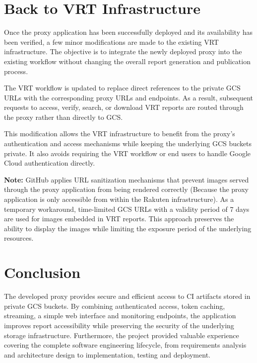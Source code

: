 \section{Back to VRT Infrastructure}

Once the proxy application has been successfully deployed and its availability has been verified, a few minor modifications are made to the existing \ac{VRT} infrastructure. The objective is to integrate the newly deployed proxy into the existing workflow without changing the overall report generation and publication process.

The \ac{VRT} workflow is updated to replace direct references to the private \ac{GCS} URLs with the corresponding proxy URLs and endpoints. As a result, subsequent requests to access, verify, search, or download \ac{VRT} reports are routed through the proxy rather than directly to \ac{GCS}.

This modification allows the \ac{VRT} infrastructure to benefit from the proxy's authentication and access mechanisms while keeping the underlying \ac{GCS} buckets private. It also avoids requiring the \ac{VRT} workflow or end users to handle Google Cloud authentication directly.

\textbf{Note:} GitHub applies URL sanitization mechanisms that prevent images served through the proxy application from being rendered correctly (Because the proxy application is only accessible from within the Rakuten infrastructure). As a temporary workaround, time-limited \ac{GCS} URLs with a validity period of 7 days are used for images embedded in \ac{VRT} reports. This approach preserves the ability to display the images while limiting the exposure period of the underlying resources.

\section{Conclusion}

The developed proxy provides secure and efficient access to \ac{CI} artifacts stored in private \ac{GCS} buckets. By combining authenticated access, token caching, streaming, a simple web interface and monitoring endpoints, the application improves report accessibility while preserving the security of the underlying storage infrastructure. Furthermore, the project provided valuable experience covering the complete software engineering lifecycle, from requirements analysis and architecture design to implementation, testing and deployment.

\clearpage
